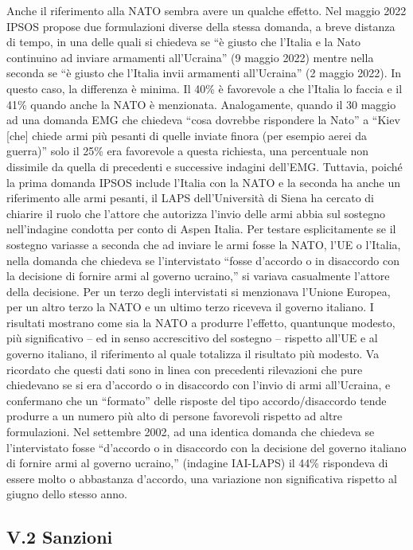 \documentclass[
  openany]{book}
\begin{document}
Anche il riferimento alla NATO sembra avere un qualche effetto. Nel maggio 2022 IPSOS propose due formulazioni diverse della stessa domanda, a breve distanza di tempo, in una delle quali si chiedeva se ``è giusto che l'Italia e la Nato continuino ad inviare armamenti all'Ucraina'' (9 maggio 2022) mentre nella seconda se ``è giusto che l'Italia invii armamenti all'Ucraina'' (2 maggio 2022). In questo caso, la differenza è minima. Il 40\% è favorevole a che l'Italia lo faccia e il 41\% quando anche la NATO è menzionata. Analogamente, quando il 30 maggio ad una domanda EMG che chiedeva ``cosa dovrebbe rispondere la Nato'' a ``Kiev {[}che{]} chiede armi più pesanti di quelle inviate finora (per esempio aerei da guerra)'' solo il 25\% era favorevole a questa richiesta, una percentuale non dissimile da quella di precedenti e successive indagini dell'EMG. Tuttavia, poiché la prima domanda IPSOS include l'Italia con la NATO e la seconda ha anche un riferimento alle armi pesanti, il LAPS dell'Università di Siena ha cercato di chiarire il ruolo che l'attore che autorizza l'invio delle armi abbia sul sostegno nell'indagine condotta per conto di Aspen Italia. Per testare esplicitamente se il sostegno variasse a seconda che ad inviare le armi fosse la NATO, l'UE o l'Italia, nella domanda che chiedeva se l'intervistato ``fosse d'accordo o in disaccordo con la decisione di fornire armi al governo ucraino,'' si variava casualmente l'attore della decisione. Per un terzo degli intervistati si menzionava l'Unione Europea, per un altro terzo la NATO e un ultimo terzo riceveva il governo italiano. I risultati mostrano come sia la NATO a produrre l'effetto, quantunque modesto, più significativo -- ed in senso accrescitivo del sostegno -- rispetto all'UE e al governo italiano, il riferimento al quale totalizza il risultato più modesto. Va ricordato che questi dati sono in linea con precedenti rilevazioni che pure chiedevano se si era d'accordo o in disaccordo con l'invio di armi all'Ucraina, e confermano che un ``formato'' delle risposte del tipo accordo/disaccordo tende produrre a un numero più alto di persone favorevoli rispetto ad altre formulazioni. Nel settembre 2002, ad una identica domanda che chiedeva se l'intervistato fosse ``d'accordo o in disaccordo con la decisione del governo italiano di fornire armi al governo ucraino,'' (indagine IAI-LAPS) il 44\% rispondeva di essere molto o abbastanza d'accordo, una variazione non significativa rispetto al giugno dello stesso anno.

\hypertarget{v.2-sanzioni}{%
\subsection{V.2 Sanzioni}\label{v.2-sanzioni}}
\end{document}
